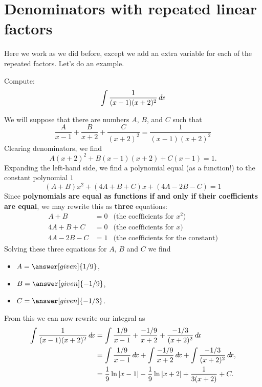 \documentclass{ximera}
\begin{document}
\section{Denominators with repeated linear factors}

Here we work as we did before, except we add an extra variable for
each of the repeated factors. Let's do an example.

\begin{example}
  Compute:
  \[
  \int \frac{1}{(x-1)(x+2)^2} \mathop{}\!d\! x
  \]
  \begin{explanation}
    We will suppose that there are numbers $A$, $B$, and $C$ such that
    \[
    \frac{A}{x-1} + \frac{B}{x+2} + \frac{C}{(x+2)^2} = \frac{1}{(x-1)(x+2)^2}
    \]
    Clearing denominators, we find
    \[
    A(x+2)^2 + B(x-1)(x+2) + C(x-1) = 1.
    \]
    Expanding the left-hand side, we find a polynomial equal (as a
    function!) to the constant polynomial $1$
    \[
    (A+B)x^2 + (4A+B+C)x + (4A-2B-C) = 1
    \]
    Since \textbf{polynomials are equal as functions if and only if
      their coefficients are equal}, we may rewrite this as
    \textbf{three} equations:
    \begin{align*}
      A+B &= 0 &\text{(the coefficients for $x^2$)}\\
      4A+B+C &= 0 &\text{(the coefficients for $x$)}\\
      4A-2B-C &= 1 &\text{(the coefficients for the constant)}
    \end{align*}
    Solving these three equations for $A$, $B$ and $C$ we find
    \begin{itemize}
    \item $A = \answer[given]{1/9}$,
    \item $B = \answer[given]{-1/9}$,
    \item $C = \answer[given]{-1/3}$.
    \end{itemize}
    From this we can now rewrite our integral as
    \begin{align*}
      \int\frac{1}{(x-1)(x+2)^2}\d x&= \int \frac{1/9}{x-1}+ \frac{-1/9}{x+2} + \frac{-1/3}{(x+2)^2}\d x\\
      &= \int \frac{1/9}{x-1}\d x + \int \frac{-1/9}{x+2}\d x + \int \frac{-1/3}{(x+2)^2}\d x,\\
      &= \frac{1}{9}\ln|x-1| -\frac{1}{9}\ln|x+2| +\frac{1}{3(x+2)}+C.
    \end{align*}
  \end{explanation}
\end{example}
\end{document}
